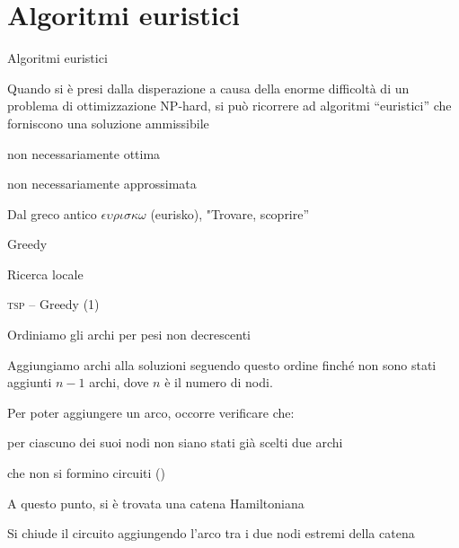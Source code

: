 \section{Algoritmi euristici}

\begin{frame}{Algoritmi euristici}

\vspace{-9pt}
\begin{myboxtitle}[Euristiche]
Quando si è presi dalla disperazione a causa della enorme difficoltà di un
problema di ottimizzazione NP-hard, si può ricorrere ad algoritmi
``euristici'' che forniscono una soluzione ammissibile
\BIL
\item non necessariamente ottima 
\item non necessariamente approssimata 
\EI

Dal greco antico $\mathit{\epsilon\upsilon\rho\iota\sigma\kappa\omega}$ %
(eurisko), "Trovare, scoprire”
\end{myboxtitle}

\begin{myboxtitle}
\BI
\item Greedy
\item Ricerca locale
\EI
\end{myboxtitle}
    
\end{frame}

\begin{frame}{\textsc{tsp} -- Greedy (1)}

\vspace{-9pt}
\begin{myboxtitle}
\BIL
\item Ordiniamo gli archi per pesi non decrescenti
\item Aggiungiamo archi alla soluzioni seguendo questo ordine finché non 
  sono stati aggiunti $n-1$ archi, dove $n$ è il numero di nodi.
\item Per poter aggiungere un arco, occorre verificare che:
  \BI
  \item per ciascuno dei suoi nodi non siano stati già scelti due archi
  \item che non si formino circuiti (\mfset)
  \EI
\item A questo punto, si è trovata una catena Hamiltoniana
\item Si chiude il circuito aggiungendo l'arco tra i due nodi estremi della catena
\EIL
\end{myboxtitle}

\end{frame}


